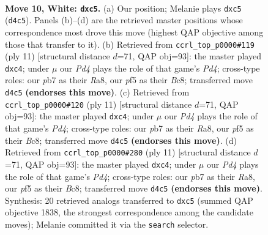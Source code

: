 \documentclass[11pt]{article}
\begin{document}
\begin{figure}[p]
\label{fig:thought-m16}
\end{figure}

\clearpage

\begin{figure}[p]\centering
\begin{subfigure}{0.46\textwidth}\centering
\resizebox{\linewidth}{!}{%
\newchessgame
\chessboard[
  setfen={r3kbnr/pp1b4/1qn1p3/2ppPppp/3P4/P1P2N2/1P1N1PPP/R1BQKB1R w Kkq f6 0 10},
  showmover=false,
  pgfstyle=straightmove, color=movearrow, markmove={d4-c5}
]}
\caption{}
\end{subfigure}\hfill
\begin{subfigure}{0.46\textwidth}\centering
\resizebox{\linewidth}{!}{%
\newchessgame
\chessboard[
  setfen={r1bqkb1r/pp1n1ppp/2p1pn2/3p4/2PP4/2NBPN2/PP3PPP/R1BQK2R b KQkq - 2 6},
  showmover=false,
  pgfstyle=straightmove, color=movearrow, markmove={d5-c4}
]}
\caption{}
\end{subfigure}
\\[4pt]
\begin{subfigure}{0.46\textwidth}\centering
\resizebox{\linewidth}{!}{%
\newchessgame
\chessboard[
  setfen={r1bqkb1r/pp1n1ppp/2p1pn2/3p4/2PP4/2NBPN2/PP3PPP/R1BQK2R b KQkq - 2 6},
  showmover=false,
  pgfstyle=straightmove, color=movearrow, markmove={d5-c4}
]}
\caption{}
\end{subfigure}\hfill
\begin{subfigure}{0.46\textwidth}\centering
\resizebox{\linewidth}{!}{%
\newchessgame
\chessboard[
  setfen={r1bqkb1r/pp1n1ppp/2p1pn2/3p4/2PP4/2NBPN2/PP3PPP/R1BQK2R b KQkq - 2 6},
  showmover=false,
  pgfstyle=straightmove, color=movearrow, markmove={d5-c4}
]}
\caption{}
\end{subfigure}
\caption{\textbf{Move 10, White: \texttt{dxc5}.} (a) Our position; Melanie plays \texttt{dxc5} (\texttt{d4c5}). Panels (b)--(d) are the retrieved master positions whose correspondence most drove this move (highest QAP objective among those that transfer to it). (b) Retrieved from \texttt{ccrl\_top\_p0000\#119} (ply 11) [structural distance $d$=71, QAP obj=93]: the master played \texttt{dxc4}; under $\mu$ our \emph{Pd4} plays the role of that game's \emph{Pd4}; cross-type roles: our \emph{p}b7 as their \emph{R}a8, our \emph{p}f5 as their \emph{B}c8; transferred move \texttt{d4c5} \textbf{(endorses this move)}. (c) Retrieved from \texttt{ccrl\_top\_p0000\#120} (ply 11) [structural distance $d$=71, QAP obj=93]: the master played \texttt{dxc4}; under $\mu$ our \emph{Pd4} plays the role of that game's \emph{Pd4}; cross-type roles: our \emph{p}b7 as their \emph{R}a8, our \emph{p}f5 as their \emph{B}c8; transferred move \texttt{d4c5} \textbf{(endorses this move)}. (d) Retrieved from \texttt{ccrl\_top\_p0000\#280} (ply 11) [structural distance $d$=71, QAP obj=93]: the master played \texttt{dxc4}; under $\mu$ our \emph{Pd4} plays the role of that game's \emph{Pd4}; cross-type roles: our \emph{p}b7 as their \emph{R}a8, our \emph{p}f5 as their \emph{B}c8; transferred move \texttt{d4c5} \textbf{(endorses this move)}. Synthesis: 20 retrieved analogs transferred to \texttt{dxc5} (summed QAP objective 1838, the strongest correspondence among the candidate moves); Melanie committed it via the \texttt{search} selector.}

\end{figure}
\end{document}
